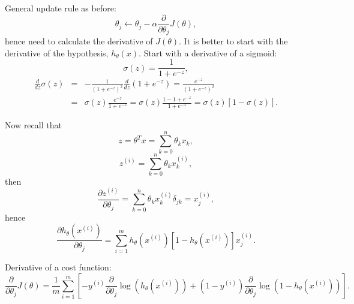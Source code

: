 \documentclass[a4paper,11pt]{article}
\begin{document}
General update rule as before:
\begin{equation}
\theta_j \leftarrow \theta_j - \alpha \frac{\partial}{\partial \theta_j} J \left( \theta \right) ,
\end{equation}
hence need to calculate the derivative of \textcolor{OliveGreen}{$J \left( \theta \right)$}. It is better to start with the derivative of the hypothesis, \textcolor{OliveGreen}{$h_\theta (x)$}. Start with a derivative of a sigmoid:
\begin{equation}
\sigma (z) = \frac{1}{1 + e^{-z}} ,
\end{equation}
\begin{eqnarray}
\frac{d}{dz} \sigma (z) &=& - \frac{1}{\left(1 + e^{-z} \right)^2} \frac{d}{dz} \left(1 + e^{-z} \right) = \frac{e^{-z}}{\left(1 + e^{-z} \right)^2} \\
&=& \sigma \left(z \right) \frac{e^{-z}}{1 + e^{-z}} = \sigma \left(z \right) \frac{1 - 1 + e^{-z}}{1 + e^{-z}} = \sigma \left(z \right) \left[1 - \sigma \left(z \right) \right] .
\end{eqnarray}

Now recall that
\begin{equation}
z = \theta^T x = \sum_{k=0} ^n \theta_k x_k ,
\end{equation}
\begin{equation}
z^{(i)} = \sum_{k=0} ^n \theta_k x_k ^{(i)} ,
\end{equation}
then
\begin{equation}
\frac{\partial z^{(i)}}{\partial \theta_j} = \sum_{k=0} ^n \theta_k x_k ^{(i)} \delta_{jk} = x_j ^{(i)} ,
\end{equation}
hence
\begin{equation}
\frac{\partial h_\theta \left(x^{(i)}\right)}{\partial \theta_j} = \sum_{i=1} ^m h_\theta \left(x^{(i)}\right) \left[1 - h_\theta \left(x^{(i)}\right) \right] x_j ^{(i)} .
\end{equation}

Derivative of a cost function:
\begin{equation}
\frac{\partial}{\partial \theta_j} J \left( \theta \right) = \frac{1}{m} \sum_{i=1} ^m \left[-y^{(i)} \frac{\partial}{\partial \theta_j} \log \left(h_\theta \left(x^{(i)}\right) \right) + \left(1 - y^{(i)} \right) \frac{\partial}{\partial \theta_j} \log \left(1 - h_\theta \left(x^{(i)}\right) \right) \right] .
\end{equation}
\end{document}

